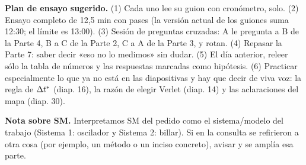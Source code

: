 \documentclass[10.5pt,a4paper]{article}
\begin{document}
\textbf{Plan de ensayo sugerido.} (1) Cada uno lee su guion con cronómetro, solo. (2) Ensayo completo de 12,5 min con pases (la versión actual de los guiones suma 12:30; el límite es 13:00). (3) Sesión de preguntas cruzadas: A le pregunta a B de la Parte 4, B a C de la Parte 2, C a A de la Parte 3, y rotan. (4) Repasar la Parte 7: saber decir «eso no lo medimos» sin dudar. (5) El día anterior, releer sólo la tabla de números y las respuestas marcadas como hipótesis. (6) Practicar especialmente lo que ya no está en las diapositivas y hay que decir de viva voz: la regla de $\Delta t^{*}$ (diap. 16), la razón de elegir Verlet (diap. 14) y las aclaraciones del mapa (diap. 30).

\textbf{Nota sobre SM.} Interpretamos SM del pedido como el sistema/modelo del trabajo (Sistema 1: oscilador y Sistema 2: billar). Si en la consulta se refirieron a otra cosa (por ejemplo, un método o un inciso concreto), avisar y se amplía esa parte.
\end{document}
